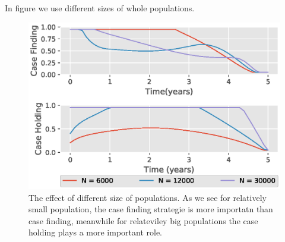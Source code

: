 In figure we use different sizes of whole populations.
\begin{figure}
\centering
\includegraphics{Figures/figure_3_two_strain_tbm}
  \caption{The effect of different size of populations. As we see for 
  relatively small population, the case finding strategie is more importatn 
  than case finding, meanwhile for relateviley big populations the case holding 
  plays a more important role.}
  \label{fig:figure3twostraintbm}
\end{figure}



